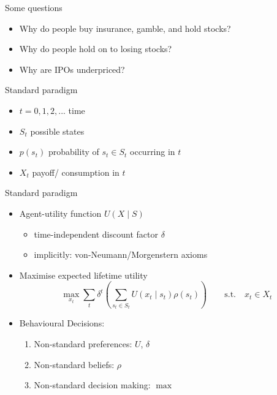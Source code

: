 \documentclass[11pt, aspectratio=169]{beamer}
\begin{document}
\begin{frame}{Some questions}
    \begin{itemize}
        \item Why do people buy insurance, gamble, and hold stocks?\bigskip
        \item Why do people hold on to losing stocks?\bigskip
        \item Why are IPOs underpriced?\bigskip
    \end{itemize}
\end{frame}

\begin{frame}{Standard paradigm}
    \begin{itemize}
        \item $t= 0,1,2,...$ time\bigskip
        \item $S_t$ possible states\bigskip
        \item $p(s_t)$ probability of $s_t \in S_t$ occurring in $t$\bigskip
        \item $X_t$ payoff/ consumption in $t$\bigskip
    \end{itemize}
\end{frame}

\begin{frame}{Standard paradigm}
\begin{itemize}
    \item Agent-utility function $U(X\mid S)$\medskip
    \begin{itemize}
\item time-independent discount factor $\delta $\medskip
\item implicitly: von-Neumann/Morgenstern axioms\medskip
\end{itemize}
    \item Maximise expected lifetime utility\medskip
	\[\max_{x_t} \sum_t  \delta^t \left(\sum_{s_t \in S_t} U(x_t \mid s_t)\rho (s_t) \right) \qquad \text{s.t.} \quad x_t \in X_t\]
    \item Behavioural Decisions:\medskip
    \begin{enumerate}[1.)]
        \item Non-standard preferences: $U$, $\delta $\medskip
        \item Non-standard beliefs: $\rho$\medskip
        \item Non-standard decision making: $\max$\medskip
    \end{enumerate}
\end{itemize}
\end{frame}
\end{document}
